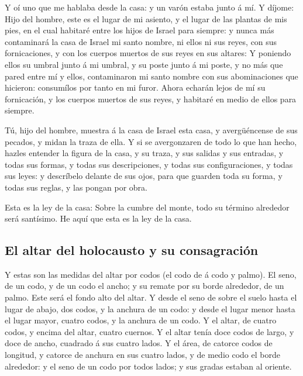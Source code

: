  Y oí uno que me hablaba desde la casa: y un varón estaba
junto á mí.  Y díjome: Hijo del hombre, este es el lugar de
mi asiento, y el lugar de las plantas de mis pies, en el cual habitaré
entre los hijos de Israel para siempre: y nunca más contaminará la casa
de Israel mi santo nombre, ni ellos ni sus reyes, con sus fornicaciones,
y con los cuerpos muertos de sus reyes en sus altares:  Y
poniendo ellos su umbral junto á mi umbral, y su poste junto á mi poste,
y no más que pared entre mí y ellos, contaminaron mi santo nombre con
sus abominaciones que hicieron: consumílos por tanto en mi furor.
 Ahora echarán lejos de mí su fornicación, y los cuerpos
muertos de sus reyes, y habitaré en medio de ellos para siempre.

 Tú, hijo del hombre, muestra á la casa de Israel esta
casa, y avergüéncense de sus pecados, y midan la traza de ella.
 Y si se avergonzaren de todo lo que han hecho, hazles
entender la figura de la casa, y su traza, y sus salidas y sus entradas,
y todas sus formas, y todas sus descripciones, y todas sus
configuraciones, y todas sus leyes: y descríbelo delante de sus ojos,
para que guarden toda su forma, y todas sus reglas, y las pongan por
obra.

 Esta es la ley de la casa: Sobre la cumbre del monte, todo
su término alrededor será santísimo. He aquí que esta es la ley de la
casa.

\hypertarget{el-altar-del-holocausto-y-su-consagraciuxf3n}{%
\subsection{El altar del holocausto y su
consagración}\label{el-altar-del-holocausto-y-su-consagraciuxf3n}}

 Y estas son las medidas del altar por codos (el codo de á
codo y palmo). El seno, de un codo, y de un codo el ancho; y su remate
por su borde alrededor, de un palmo. Este será el fondo alto del altar.
 Y desde el seno de sobre el suelo hasta el lugar de abajo,
dos codos, y la anchura de un codo: y desde el lugar menor hasta el
lugar mayor, cuatro codos, y la anchura de un codo.  Y el
altar, de cuatro codos, y encima del altar, cuatro cuernos.
 Y el altar tenía doce codos de largo, y doce de ancho,
cuadrado á sus cuatro lados.  Y el área, de catorce codos
de longitud, y catorce de anchura en sus cuatro lados, y de medio codo
el borde alrededor: y el seno de un codo por todos lados; y sus gradas
estaban al oriente.

